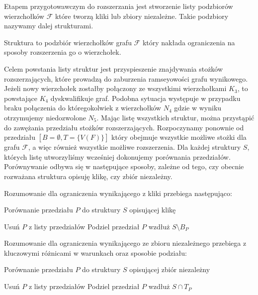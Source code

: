 Etapem przygotowawczym do rozszerzania jest stworzenie listy podzbiorów wierzchołków $\mathcal{F}$ które tworzą kliki lub zbiory niezależne. Takie podzbiory nazywamy dalej strukturami.

\begin{definition} Struktura to podzbiór wierzchołków grafu $\mathcal{F}$ który nakłada ograniczenia na sposoby rozszerzenia go o wierzchołek.
\end{definition}

Celem powstania listy struktur jest przyspieszenie znajdywania stożków rozszerzających, które prowadzą do zaburzenia ramseyowości grafu wynikowego. Jeżeli nowy wierzchołek zostałby połączony ze wszystkimi wierzchołkami $K_3$, to powstające $K_4$ dyskwalifikuje graf. Podobna sytuacja występuje w przypadku braku połączenia do któregokolwiek z wierzchołków $N_4$ gdzie w wyniku otrzymujemy niedozwolone $N_5$. 
Mając listę wszystkich struktur, można przystąpić do zawężania przedziału stożków rozszerzających. Rozpoczynamy ponownie od przedziału $[B = \emptyset, T = \{V(F)\} ]$ który obejmuje wszystkie możliwe stożki dla grafu $\mathcal{F}$, a więc również wszystkie możliwe rozszerzenia. Dla każdej struktury $S$, których listę utworzyliśmy wcześniej dokonujemy porównania przedziałów. Porównywanie odbywa się w następujące sposoby, zależne od tego, czy obecnie rozważana struktura opisuję klikę, czy zbiór niezależny.

Rozumowanie dla ograniczenia wynikającego z kliki przebiega następująco:
\begin{algorithm}[H]
  \caption{Porównanie przedziału $P$ do struktury $S$ opisującej klikę}
  \begin{algorithmic}
	  \STATE Usuń $P$ z listy przedziałów
	\ELSE
	  \STATE Podziel przedział $P$ wzdłuż $S \setminus B_P  $
  	\ENDIF
  \ENDIF  
  \end{algorithmic}
\end{algorithm}

Rozumowanie dla ograniczenia wynikającego ze zbioru niezależnego przebiega z kluczowymi różnicami w warunkach oraz sposobie podziału:

\begin{algorithm}[H]
  \caption{Porównanie przedziału $P$ do struktury $S$ opisującej zbiór niezależny}
  \begin{algorithmic}
	  \STATE Usuń $P$ z listy przedziałów
	\ELSE
	  \STATE Podziel przedział $P$ wzdłuż $S \cap T_P  $
  	\ENDIF
  \ENDIF  
  \end{algorithmic}
\end{algorithm}

